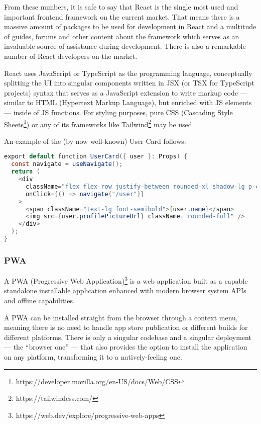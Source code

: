 \documentclass[
  digital,     %
  color,       %
  oneside,     %
  nosansbold,  %
  nocolorbold, %
  lof,         %
  lot,         %
]{fithesis4}
\begin{document}
From these numbers, it is safe to say that React is the single most used and important frontend framework on the current market. That means there is a massive amount of packages to be used for development in React and a multitude of guides, forums and other content about the framework which serves as an invaluable source of assistance during development. There is also a remarkable number of React developers on the market.

React uses JavaScript or TypeScript as the programming language, conceptually splitting the UI into singular components written in JSX (or TSX for TypeScript projects) syntax that serves as a JavaScript extension to write markup code --- similar to HTML (Hypertext Markup Language), but enriched with JS elements --- inside of JS functions\cite{jsx}. For styling purposes, pure CSS (Cascading Style Sheets\footnote{https://developer.mozilla.org/en-US/docs/Web/CSS}) or any of its frameworks like Tailwind\footnote{https://tailwindcss.com/} may be used.

An example of the (by now well-known) User Card follows:

\begin{lstlisting}[language=java, caption={React + Tailwind example --- User Card}]
export default function UserCard({ user }: Props) {
  const navigate = useNavigate();
  return (
    <div
      className="flex flex-row justify-between rounded-xl shadow-lg p-4"
      onClick={() => navigate("/user")}
    >
      <span className="text-lg font-semibold">{user.name}</span>
      <img src={user.profilePictureUrl} className="rounded-full" />
    </div>
  );
}
\end{lstlisting}

\subsubsection{PWA}
A PWA (Progressive Web Application)\footnote{https://web.dev/explore/progressive-web-apps} is a web application built as a capable standalone installable application enhanced with modern browser system APIs and offline capabilities\cite{pwaInfo}. 

A PWA can be installed straight from the browser through a context menu, meaning there is no need to handle app store publication or different builds for different platforms. There is only a singular codebase and a singular deployment --- the ``browser one'' --- that also provides the option to install the application on any platform, transforming it to a natively-feeling one. 
\end{document}

